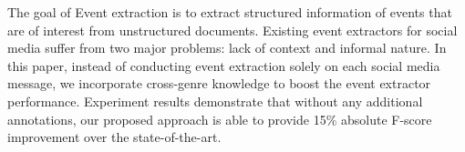 The goal of Event extraction is to extract structured information of events that are of interest from unstructured documents. Existing event extractors for social media suffer from two major problems: lack of context and informal nature. In this paper, instead of conducting event extraction solely on each social media message, we incorporate cross-genre knowledge to boost the event extractor performance. Experiment results demonstrate that without any additional annotations, our proposed approach is able to provide 15\% absolute F-score improvement over the state-of-the-art.
